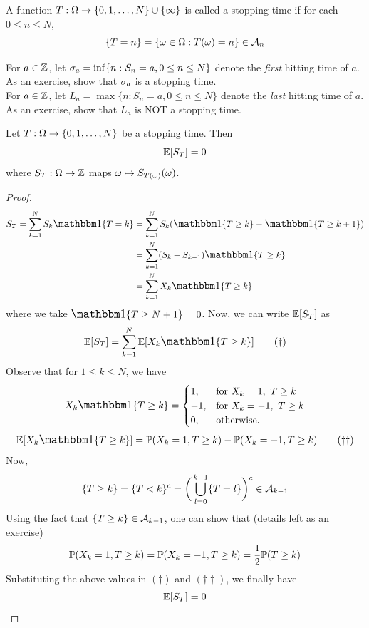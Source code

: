 \documentclass[main]{subfiles}
\begin{document}
\begin{definition}
    A function $ T:\Omega\to\{0, 1, \ldots, N\}\cup\{\infty\} $ is called a stopping time if for each $ 0\le n\le N $,  \[\{T=n\}=\{\omega\in\Omega:T(\omega)=n\}\in\mathcal A_n\]
\end{definition}

\ex For $ a\in\mathbb Z $, let $ \sigma_a=\inf\{n: S_n=a, 0\le n\le N\} $ denote the \textit{first} hitting time of $ a $. As an exercise, show that $ \sigma_a $ is a stopping time.\\

\ex For $ a\in\mathbb Z $, let $ L_a=\max\{n: S_n=a, 0\le n\le N\}$ denote the \textit{last} hitting time of $ a $. As an exercise, show that $ L_a $ is NOT a stopping time.

\begin{theorem}
    Let $ T:\Omega\to\{0,1,\ldots,N\} $ be a stopping time. Then \[\mathbb E[S_T]=0\] where $ S_T:\Omega\to\mathbb Z $ maps $ \omega\mapsto S_{T(\omega)}(\omega) $.
\end{theorem}

\begin{proof}
    \begin{align*}
        S_T=\sum_{k=1}^NS_k\one\{T=k\}
         & = \sum_{k=1}^NS_k(\one\{T\ge k\}-\one\{T\ge k+1\}) \\
         & = \sum_{k=1}^N(S_k-S_{k-1})\one\{T\ge k\}          \\
         & = \sum_{k=1}^NX_k\one\{T\ge k\}
    \end{align*}
    where we take $ \mathlarger{\one}\{T\ge N+1\}=0 $. Now, we can write $ \mathbb E[S_T] $ as \[\E[S_T]=\sum_{k=1}^N\E[X_k\one\{T\ge k\}]\tag{$ \dagger $}\]
    Observe that for $ 1\le k\le N $, we have
    \[
        X_k\one\{T\ge k\} =
        \begin{cases}
            1,  & \text{for } X_k=1,\ T\ge k  \\
            -1, & \text{for } X_k=-1,\ T\ge k \\
            0,  & \text{otherwise.}
        \end{cases}
    \]
    \[\E[X_k\one\{T\ge k\}]=\P(X_k=1,T\ge k)-\P(X_k=-1,T\ge k) \tag{$ \dagger\dagger $}\]
    Now,
    \[\{T\ge k\}=\{T<k\}^c=\bigg(\bigcup_{l=0}^{k-1}\{T=l\}\bigg)^c\in\mathcal A_{k-1}\]
    Using the fact that $ \{T\ge k\}\in\mathcal A_{k-1} $, one can show that (details left as an exercise)
    \[\mathbb P(X_k=1,T\ge k)=\mathbb P(X_k=-1,T\ge k)=\frac{1}{2}\mathbb P(T\ge k)\]
    Substituting the above values in $ (\dagger) $ and $ (\dagger\dagger) $, we finally have
    \[\mathbb E[S_T]=0\]
\end{proof}
\end{document}
